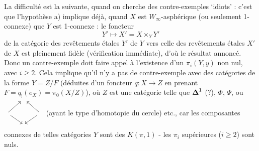 La difficulté est la suivante, quand on cherche des contre-exemples `idiots' : c'est que l'hypothèse a) implique déjà, quand $X$ est $W_\infty$-asphérique (ou seulement 1-connexe) que $Y$ est 1-connexe : le foncteur
\[
Y' \longmapsto X' = X \times_Y Y'
\]
de la catégorie des revêtements étales $Y'$ de $Y$ vers celle des revêtements étales $X'$ de $X$ est pleinement fidèle (vérification immédiate), d'où le résultat annoncé. Donc un contre-exemple doit faire appel à l'existence d'un $\pi_i(Y,y)$ non nul, avec $i \geq 2$. Cela implique
qu'il n'y a pas de contre-exemple avec des catégories de la forme $Y = Z/F$ (déduites d'un foncteur $q : X \longrightarrow Z$ en prenant $F = q_!(e_X) = \pi_0(X/Z)$), où $Z$ est une catégorie telle que $\boldsymbol{\Delta}^1$ (?), $\Phi$, $\Psi$, ou $\begin{tikzcd}[ampersand replacement=\&, sep=small, baseline=(M.base)]
 \& {} \& \\
{} \arrow[ur] \arrow[dr] \& |[alias=M]| \phantom{x} \& {} \arrow[ul] \arrow[dl] \\
 \& {} \&
\end{tikzcd}$ (ayant le type d'homotopie du cercle) etc., car les composantes connexes de telles catégories $Y$ sont des $K(\pi,1)$ - les $\pi_i$ supérieures ($i \geq 2$) sont nuls.

